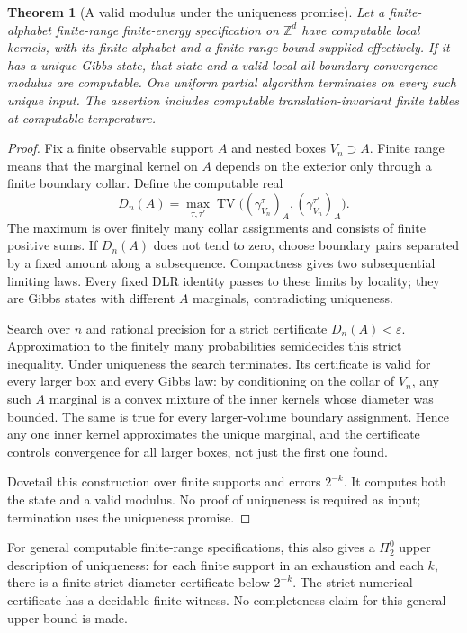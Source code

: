 \documentclass[11pt,reqno]{amsart}
\numberwithin{equation}{section}
\newtheorem{theorem}{Theorem}[section]
\theoremstyle{definition}
\theoremstyle{remark}
\newcommand{\Z}{\mathbb Z}
\newcommand{\TV}{\operatorname{TV}}
\begin{document}
\begin{theorem}[A valid modulus under the uniqueness promise]\label{thm:effectivemodulus}
Let a finite-alphabet finite-range finite-energy specification on $\Z^d$ have computable local kernels, with its finite alphabet and a finite-range bound supplied effectively. If it has a unique Gibbs state, that state and a valid local all-boundary convergence modulus are computable. One uniform partial algorithm terminates on every such unique input. The assertion includes computable translation-invariant finite tables at computable temperature.
\end{theorem}
\begin{proof}
Fix a finite observable support $A$ and nested boxes $V_n\supset A$. Finite range means that the marginal kernel on $A$ depends on the exterior only through a finite boundary collar. Define the computable real
\[
 D_n(A)=\max_{\tau,\tau'}\TV\bigl((\gamma_{V_n}^\tau)_A,(\gamma_{V_n}^{\tau'})_A\bigr).
\]
The maximum is over finitely many collar assignments and consists of finite positive sums. If $D_n(A)$ does not tend to zero, choose boundary pairs separated by a fixed amount along a subsequence. Compactness gives two subsequential limiting laws. Every fixed DLR identity passes to these limits by locality; they are Gibbs states with different $A$ marginals, contradicting uniqueness.

Search over $n$ and rational precision for a strict certificate $D_n(A)<\varepsilon$. Approximation to the finitely many probabilities semidecides this strict inequality. Under uniqueness the search terminates. Its certificate is valid for every larger box and every Gibbs law: by conditioning on the collar of $V_n$, any such $A$ marginal is a convex mixture of the inner kernels whose diameter was bounded. The same is true for every larger-volume boundary assignment. Hence any one inner kernel approximates the unique marginal, and the certificate controls convergence for all larger boxes, not just the first one found.

Dovetail this construction over finite supports and errors $2^{-k}$. It computes both the state and a valid modulus. No proof of uniqueness is required as input; termination uses the uniqueness promise.
\end{proof}

For general computable finite-range specifications, this also gives a $\Pi^0_2$ upper description of uniqueness: for each finite support in an exhaustion and each $k$, there is a finite strict-diameter certificate below $2^{-k}$. The strict numerical certificate has a decidable finite witness. No completeness claim for this general upper bound is made.
\end{document}
